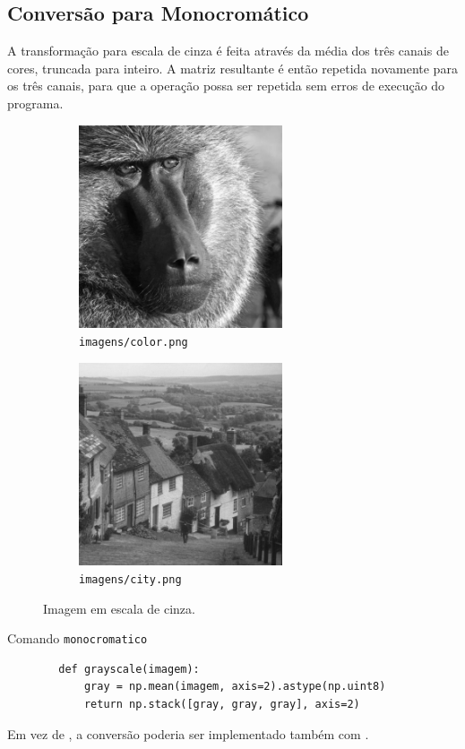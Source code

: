 \subsection{Conversão para Monocromático}

A transformação para escala de cinza é feita através da média dos três canais de cores, truncada para inteiro. A matriz resultante é então repetida novamente para os três canais, para que a operação possa ser repetida sem erros de execução do programa.

\begin{figure}[H]
    \centering
    \begin{subfigure}{0.45\textwidth}
        \centering
        \includegraphics[width=6cm]{resultados/colormono.png}
        \caption{\texttt{imagens/color.png}}
    \end{subfigure}%
    \begin{subfigure}{0.45\textwidth}
        \centering
        \includegraphics[width=6cm]{resultados/citymono.png}
        \caption{\texttt{imagens/city.png}}
    \end{subfigure}

    \caption{Imagem em escala de cinza.}
\end{figure}

\begin{listing}[htb]
    \caption{Comando \texttt{monocromatico}}

    \begin{verbatim}
        def grayscale(imagem):
            gray = np.mean(imagem, axis=2).astype(np.uint8)
            return np.stack([gray, gray, gray], axis=2)
    \end{verbatim}
\end{listing}

Em vez de , a conversão poderia ser implementado também com  \autocite{ref:cvtcolor}.
